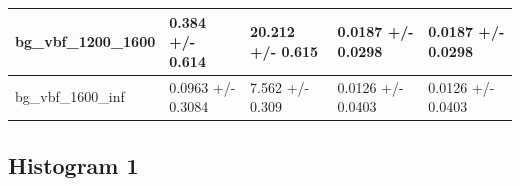 \documentclass[a4paper, 10pt]{article}
\begin{document}
\begin{table}[H]
\begin{center}
\begin{tabular}{|m{20.0mm}|m{27.0mm}|m{27.0mm}|m{33.0mm}|m{32.0mm}|}
      \hline
      {\cellcolor{white}         bg\_vbf\_1200\_1600}& {\cellcolor{white}         0.384 +/\-- 0.614}& {\cellcolor{white}         20.212 +/\-- 0.615}& {\cellcolor{white}         0.0187 +/\-- 0.0298}& {\cellcolor{white}         0.0187 +/\-- 0.0298}\\
      \hline
      {\cellcolor{white}         bg\_vbf\_1600\_inf}& {\cellcolor{white}         0.0963 +/\-- 0.3084}& {\cellcolor{white}         7.562 +/\-- 0.309}& {\cellcolor{white}         0.0126 +/\-- 0.0403}& {\cellcolor{white}         0.0126 +/\-- 0.0403}\\
\hline
    \end{tabular}
  \end{center}
\end{table}

   \newpage
\subsection{ Histogram 1}
\end{document}
